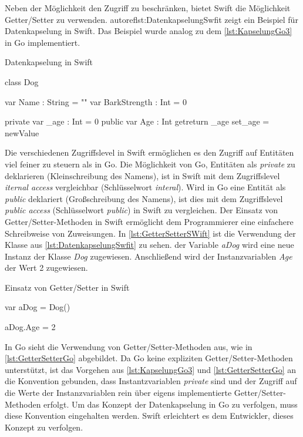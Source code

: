 Neben der Möglichkeit den Zugriff zu beschränken, bietet Swift die Möglichkeit Getter/Setter zu verwenden.
autoref{lst:DatenkapselungSwfit} zeigt ein Beispiel für Datenkapselung in Swift. 
Das Beispiel wurde analog zu dem \autoref{lst:KapselungGo3} in Go implementiert.

\begin{listing}
\caption{Datenkapselung in Swift}
\label{lst:DatenkapselungSwfit}
\begin{SwiftCode}
class Dog {
    var Name : String = ""
    var BarkStrength : Int = 0
	
    private var _age : Int = 0
    public var Age : Int {
        get{return _age}
        set{_age = newValue}
    }
}
\end{SwiftCode}
\end{listing}

Die verschiedenen Zugriffslevel in Swift ermöglichen es den Zugriff auf Entitäten viel feiner zu steuern als in Go.
Die Möglichkeit von Go, Entitäten als \textit{private} zu deklarieren (Kleinschreibung des Namens), ist in Swift mit dem Zugriffslevel \textit{iternal access} vergleichbar (Schlüsselwort \textit{interal}). 
Wird in Go eine Entität als \textit{public} deklariert (Großschreibung des Namens), ist dies mit dem Zugriffslevel \textit{public access} (Schlüsselwort \textit{public}) in Swift zu vergleichen.
Der Einsatz von Getter/Setter-Methoden in Swift ermöglicht dem Programmierer eine einfachere Schreibweise von Zuweisungen. 
In \autoref{lst:GetterSetterSWift} ist die Verwendung der Klasse aus \autoref{lst:DatenkapselungSwfit} zu sehen. 
der Variable \textit{aDog} wird eine neue Instanz der Klasse \textit{Dog} zugewiesen.
Anschließend wird der Instanzvariablen \textit{Age} der Wert 2 zugewiesen.

\begin{listing}
\caption{Einsatz von Getter/Setter in Swift}
\label{lst:GetterSetterSWift}
\begin{SwiftCode}
var aDog = Dog()

aDog.Age = 2

\end{SwiftCode}
\end{listing}

In Go sieht die Verwendung von Getter/Setter-Methoden aus, wie in \autoref{lst:GetterSetterGo} abgebildet.
Da Go keine expliziten Getter/Setter-Methoden unterstützt, ist das Vorgehen aus \autoref{lst:KapselungGo3} und \autoref{lst:GetterSetterGo} an die Konvention gebunden, dass Instantzvariablen \textit{private} sind und der Zugriff auf die Werte der Instanzvariablen rein über eigens implementierte Getter/Setter-Methoden erfolgt.
Um das Konzept der Datenkapselung in Go zu verfolgen, muss diese Konvention eingehalten werden.
Swift erleichtert es dem Entwickler, dieses Konzept zu verfolgen.

